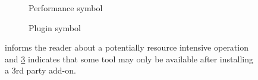 \begin{figure}[h!]
	\begin{centering}
		\begin{subfigure}{0.5\textwidth}
			
			\caption{Performance symbol}\label{fig:performance_icon}
		\end{subfigure}
		\begin{subfigure}{0.5\textwidth}
			
			\caption{Plugin symbol}\label{fig:plugin_icon}
		\end{subfigure}
	\end{centering}
	\caption{ informs the reader about a potentially resource intensive operation and \cref{fig:plugin_icon} indicates that some tool may only be available after installing a 3rd party add-on.}
\end{figure}
\par\medskip

